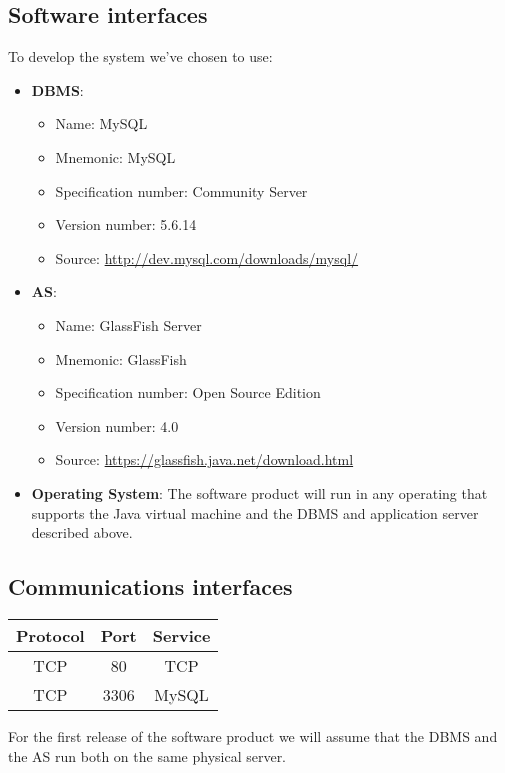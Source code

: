 \documentclass[a4paper,12pt]{book}
\begin{document}
\subsection{Software interfaces}
To develop the system we've chosen to use:
\begin{itemize}
  \item \textbf{DBMS}:
  \begin{itemize}[noitemsep]
    \item Name: MySQL
    \item Mnemonic: MySQL
    \item Specification number: Community Server
    \item Version number: 5.6.14
    \item Source: \url{http://dev.mysql.com/downloads/mysql/}
  \end{itemize}
  \item \textbf{AS}:
  \begin{itemize}[noitemsep]
    \item Name: GlassFish Server
    \item Mnemonic: GlassFish
    \item Specification number: Open Source Edition
    \item Version number: 4.0
    \item Source: \url{https://glassfish.java.net/download.html}
  \end{itemize}
  \item \textbf{Operating System}: The software product will run in any operating that supports the Java virtual machine and the DBMS and application server described above.
\end{itemize}

\subsection{Communications interfaces}
\begin{center}
  \begin{tabular}{ | c | c | c |}
    \hline
    Protocol & Port & Service \\ \hline
    TCP & 80 & TCP \\ \hline
    TCP & 3306 & MySQL \\
    \hline
  \end{tabular}
\end{center}
For the first release of the software product we will assume that the DBMS and the AS run both on the same physical server.
\end{document}
